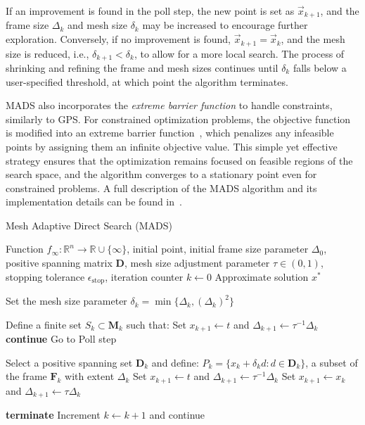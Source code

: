 If an improvement is found in the poll step, the new point is set as $ \vec{x}_{k+1} $, and the frame size $ \Delta_k $ and mesh size $ \delta_k $ may be increased to encourage further exploration. Conversely, if no improvement is found, $ \vec{x}_{k+1} = \vec{x}_k $, and the mesh size is reduced, i.e., $ \delta_{k+1} < \delta_k $, to allow for a more local search. The process of shrinking and refining the frame and mesh sizes continues until $ \delta_k $ falls below a user-specified threshold, at which point the algorithm terminates.

MADS also incorporates the \textit{extreme barrier function} to handle constraints, similarly to GPS. For constrained optimization problems, the objective function is modified into an extreme barrier function~\cite{BBO-textbook}, which penalizes any infeasible points by assigning them an infinite objective value. This simple yet effective strategy ensures that the optimization remains focused on feasible regions of the search space, and the algorithm converges to a stationary point even for constrained problems. A full description of the MADS algorithm and its implementation details can be found in~\cite{BBO-textbook}.



\begin{algorithm}[H]
	\caption{Mesh Adaptive Direct Search (MADS)}\label{MADS}
	\begin{algorithmic}[1]
		\Require Function $f_{\infty}: \mathbb{R}^n \to \mathbb{R} \cup \{\infty\}$, initial point, initial frame size parameter $\Delta_0$, positive spanning matrix $\mathbf{D}$, mesh size adjustment parameter $\tau \in (0,1)$, stopping tolerance $\epsilon_{\text{stop}}$, iteration counter $k \gets 0$
		\Ensure Approximate solution $x^*$
		
		
		
		\State Set the mesh size parameter $\delta_k = \min \{\Delta_k, (\Delta_k)^2\}$
		
		\State Define a finite set $S_k \subset \mathbf{M}_k$ such that:
		\State Set $x_{k+1} \gets t$ and $\Delta_{k+1} \gets \tau^{-1}\Delta_k$
		\State \textbf{continue}
		\Else
		\State Go to Poll step
		\EndIf
		
		\State Select a positive spanning set $\mathbf{D}_{k}$ and define:
		\State $P_k = \{x_k + \delta_k d : d \in \mathbf{D}_{k}\}$, a subset of the frame $\mathbf{F}_k$ with extent $\Delta_k$
		\State Set $x_{k+1} \gets t$ and $\Delta_{k+1} \gets \tau^{-1}\Delta_k$
		\Else
		\State Set $x_{k+1} \gets x_k$ and $\Delta_{k+1} \gets \tau\Delta_k$
		\EndIf
		
		\State \textbf{terminate}
		\Else
		\State Increment $k \gets k+1$ and continue
		\EndIf
		
		\EndWhile
		\EndProcedure
	\end{algorithmic}
\end{algorithm}